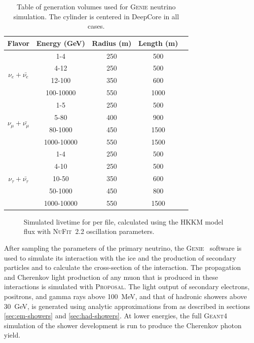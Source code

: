 \begin{table}
\caption{Table of generation volumes used for \textsc{Genie} neutrino simulation. The cylinder is centered in DeepCore in all cases. \label{table:GENIE}}
\begin{center}
\begin{tabular}{ ccccc } 
\textbf{Flavor} & \textbf{Energy (GeV)} & \textbf{Radius (m)} & \textbf{Length (m)}\\
\toprule
\multirow{4}{*}{$\nu_e+\bar{\nu_e}$}  & 1-4 & 250 & 500 \\
 & 4-12 & 250 & 500   \\ 
 & 12-100 & 350 & 600  \\
 & 100-10000 & 550 & 1000  \\
 \midrule
\multirow{4}{*}{$\nu_{\mu}+\bar{\nu_{\mu}}$} & 1-5 & 250 & 500\\
 & 5-80 & 400 & 900\\
 & 80-1000 & 450 & 1500\\
 & 1000-10000 & 550 & 1500\\
 \midrule
\multirow{5}{*}{$\nu_{\tau}+\bar{\nu_{\tau}}$} & 1-4 & 250 & 500\\
 & 4-10 & 250 & 500\\
 & 10-50 & 350 & 600\\
 & 50-1000 & 450 & 800\\
 & 1000-10000 & 550 & 1500\\
 \bottomrule
\end{tabular}
\end{center}
\end{table}

\begin{figure}
    \centering
    
    \caption{Simulated livetime for per file, calculated using the HKKM model flux with \textsc{NuFit}~2.2\cite{nufit22} oscillation parameters.}
    \label{fig:sim-livetime}
\end{figure}

After sampling the parameters of the primary neutrino, the \textsc{Genie}~ software is used to simulate its interaction with the ice and the production of secondary particles and to calculate the cross-section of the interaction. The propagation and Cherenkov light production of any muon that is produced in these interactions is simulated with \textsc{Proposal}. The light output of secondary electrons, positrons, and gamma rays above 100~MeV, and that of hadronic showers above 30~GeV, is generated using analytic approximations from \cite{RADEL2013102} as described in sections \ref{sec:em-showers} and \ref{sec:had-showers}. At lower energies, the full \textsc{Geant4} simulation of the shower development is run to produce the Cherenkov photon yield.

